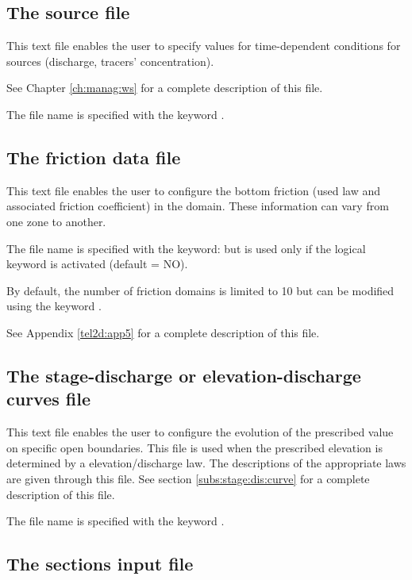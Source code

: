 \subsection{The source file}

This text file enables the user to specify values for time-dependent conditions
for sources (discharge, tracers' concentration).

See Chapter \ref{ch:manag:ws} for a complete description of this file.

The file name is specified with the keyword .


\subsection{The friction data file}

This text file enables the user to configure the bottom friction
(used law and associated friction coefficient) in the domain.
These information can vary from one zone to another.

The file name is specified with the keyword: 
but is used only if the logical keyword  is activated
(default = NO).

By default, the number of friction domains is limited to 10 but can be modified
using the keyword .

See Appendix \ref{tel2d:app5} for a complete description of this file.


\subsection{The stage-discharge or elevation-discharge curves file}

This text file enables the user to configure the evolution of the prescribed
value on specific open boundaries.
This file is used when the prescribed elevation is determined
by a elevation/discharge law.
The descriptions of the appropriate laws are given through this file.
See section \ref{subs:stage:dis:curve} for a complete description of this file.

The file name is specified with the keyword .


\subsection{The sections input file}

